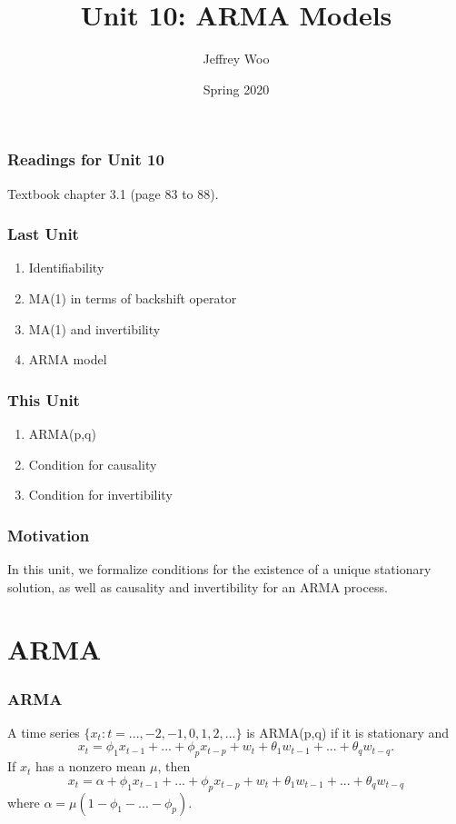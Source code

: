 \documentclass[%
xcolor=pdftex]{beamer}
\title{Unit 10: ARMA Models}
\author[STAT 5170: Applied Time Series, Unit 10]{Jeffrey Woo}
\institute{Department of Statistics, University of Virginia}
\date{Spring 2020}
\begin{document}
\frame{\titlepage}


\begin{frame}
\frametitle{Readings for Unit 10}

Textbook chapter 3.1 (page 83 to 88).

\end{frame}



\begin{frame}
\frametitle{Last Unit}
\begin{enumerate}
\item Identifiability
\item MA(1) in terms of backshift operator
\item MA(1) and invertibility
\item ARMA model
\end{enumerate}
\end{frame}

\begin{frame}
\frametitle{This Unit}
\begin{enumerate}
\item ARMA(p,q)
\item Condition for causality
\item Condition for invertibility
\end{enumerate}\end{frame}


\begin{frame}
\frametitle{Motivation}

In this unit, we formalize conditions for the existence of a unique stationary solution, as well as causality and invertibility for an ARMA process.

\end{frame}

\section{ARMA}
\frame{\tableofcontents[currentsection]}

\begin{frame}
\frametitle{ARMA}

A time series $\{x_t: t=...,-2,-1,0,1,2,...\}$ is ARMA(p,q) if it is stationary and
\begin{equation*}
x_t=\phi_1 x_{t-1}+...+\phi_p x_{t-p}+w_t+\theta_1 w_{t-1}+...+\theta_q w_{t-q}.
\end{equation*}
If $x_t$ has a nonzero mean $\mu$, then
$$
x_t=\alpha + \phi_1 x_{t-1}+...+\phi_p x_{t-p}+w_t+\theta_1 w_{t-1}+...+\theta_q w_{t-q}
$$
where $\alpha=\mu(1-\phi_1-...-\phi_p)$.

\end{frame}
\end{document}
